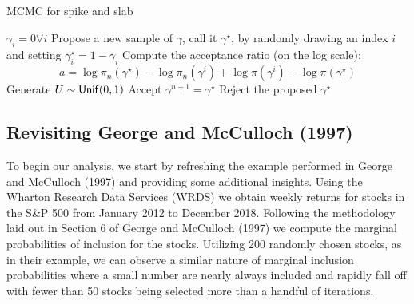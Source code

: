 \documentclass[a4paper, 12pt]{article}
\theoremstyle{plain}
\theoremstyle{definition}
\theoremstyle{remark}
\newcommand{\unif}{{\sf Unif}}
\begin{document}
\begin{algorithm}
\caption{MCMC for spike and slab}
\begin{algorithmic}[1] 
\State $\gamma_i = 0 \forall i$
\State Propose a new sample of $\gamma$, call it $\gamma^\star$, by randomly drawing an index $i$ and setting $\gamma^\star_i=1-\gamma_i$
\State Compute the acceptance ratio (on the log scale):
	\[a=\log \pi_n(\gamma^\star) - \log \pi_n(\gamma^i) + \log \pi(\gamma^i) - \log \pi(\gamma^\star)\]
\State Generate $U\sim \unif(0,1)$
\State Accept $\gamma^{n+1}=\gamma^\star$
\Else
\State Reject the proposed $\gamma^\star$
\EndIf
\EndWhile
\end{algorithmic}
\end{algorithm}


\subsection{Revisiting George and McCulloch (1997)}

To begin our analysis, we start by refreshing the example performed in George and McCulloch (1997) and providing some additional insights. Using the Wharton Research Data Services (WRDS) we obtain weekly returns for stocks in the S\&P 500 from January 2012 to December 2018. Following the methodology laid out in Section 6 of George and McCulloch (1997) we compute the marginal probabilities of inclusion for the stocks. Utilizing 200 randomly chosen stocks, as in their example, we can observe a similar nature of marginal inclusion probabilities where a small number are nearly always included and rapidly fall off with fewer than 50 stocks being selected more than a handful of iterations.
\end{document}
